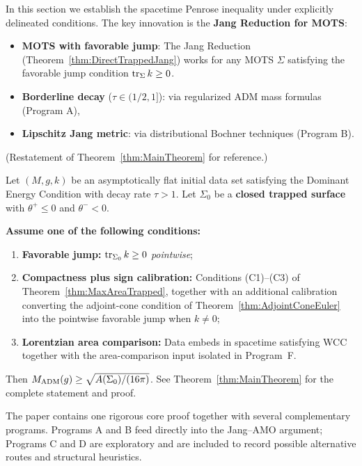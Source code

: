 \label{sec:Unconditional}

In this section we establish the spacetime Penrose inequality under explicitly delineated conditions. The key innovation is the \textbf{Jang Reduction for MOTS}:
\begin{itemize}
    \item \textbf{MOTS with favorable jump}: The Jang Reduction (Theorem~\ref{thm:DirectTrappedJang}) works for any MOTS $\Sigma$ satisfying the favorable jump condition $\operatorname{tr}_{\Sigma} k \ge 0$.
    \item \textbf{Borderline decay} ($\tau \in (1/2, 1]$): via regularized ADM mass formulas (Program A),
    \item \textbf{Lipschitz Jang metric}: via distributional Bochner techniques (Program B).
\end{itemize}

\begin{theorem}\label{thm:TrappedSurfacePI}
\textup{(}Restatement of Theorem~\textup{\ref{thm:MainTheorem}} for reference.\textup{)}

Let $(M, g, k)$ be an asymptotically flat initial data set satisfying the Dominant Energy Condition with decay rate $\tau > 1$. Let $\Sigma_0$ be a \textbf{closed trapped surface} with $\theta^+ \le 0$ and $\theta^- < 0$. 

\textbf{Assume one of the following conditions:}
\begin{enumerate}
    \item[(A)] \textbf{Favorable jump:} $\operatorname{tr}_{\Sigma_0} k \ge 0$ \emph{pointwise};
    \item[(B)] \textbf{Compactness plus sign calibration:} Conditions (C1)--(C3) of Theorem~\ref{thm:MaxAreaTrapped}, together with an additional calibration converting the adjoint-cone condition of Theorem~\ref{thm:AdjointConeEuler} into the pointwise favorable jump when $k\neq0$;
    \item[(C)] \textbf{Lorentzian area comparison:} Data embeds in spacetime satisfying WCC together with the area-comparison input isolated in Program~F.
\end{enumerate}
Then $M_{\mathrm{ADM}}(g) \ge \sqrt{A(\Sigma_0)/(16\pi)}$. See Theorem~\ref{thm:MainTheorem} for the complete statement and proof.
\end{theorem}

The paper contains one rigorous core proof together with several complementary programs. Programs A and B feed directly into the Jang--AMO argument; Programs C and D are exploratory and are included to record possible alternative routes and structural heuristics.

